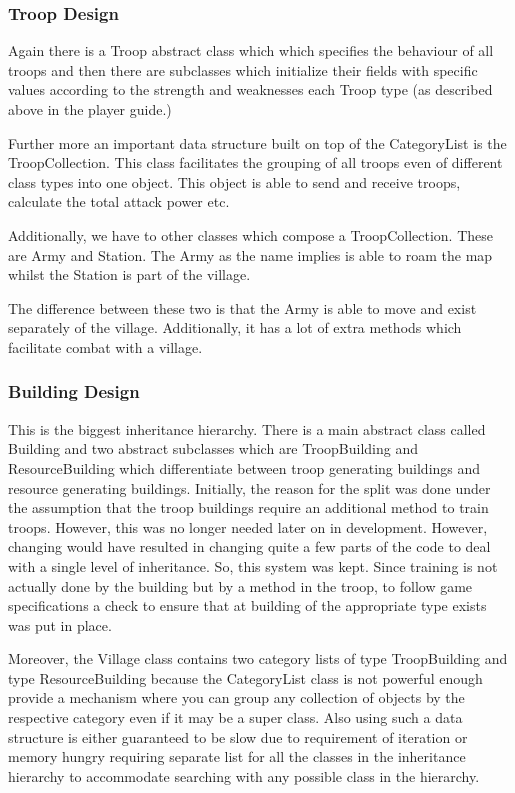 \documentclass[12pt]{article}
\begin{document}
\subsubsection{Troop Design}

Again there is a Troop abstract class which which specifies the
behaviour of all troops and then there are subclasses which
initialize their fields with specific values according to the
strength and weaknesses each Troop type (as described above in
the player guide.)

Further more an important data structure built on top of the
CategoryList is the TroopCollection. This class facilitates the
grouping of all troops even of different class types into one
object. This object is able to send and receive troops,
calculate the total attack power etc.

Additionally, we have to other classes which compose a
TroopCollection. These are Army and Station. The Army as the
name implies is able to roam the map whilst the Station is part
of the village.

The difference between these two is that the Army is able to
move and exist separately of the village. Additionally, it has a
lot of extra methods which facilitate combat with a village.

\subsubsection{Building Design}

This is the biggest inheritance hierarchy. There is a main
abstract class called Building and two abstract subclasses which
are TroopBuilding and ResourceBuilding which differentiate
between troop generating buildings and resource generating
buildings. Initially, the reason for the split was done under
the assumption that the troop buildings require an additional
method to train troops. However, this was no longer needed later
on in development. However, changing would have resulted in
changing quite a few parts of the code to deal with a single
level of inheritance. So, this system was kept. Since training
is not actually done by the building but by a method in the
troop, to follow game specifications a check to ensure that at
building of the appropriate type exists was put in place.

Moreover, the Village class contains two category lists of type
TroopBuilding and type ResourceBuilding because the CategoryList
class is not powerful enough provide a mechanism where you can
group any collection of objects by the respective category even
if it may be a super class. Also using such a data structure is
either guaranteed to be slow due to requirement of iteration or
memory hungry requiring separate list for all the classes in
the inheritance hierarchy to accommodate searching with any
possible class in the hierarchy.
\end{document}

